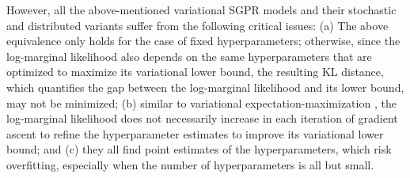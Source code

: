 \documentclass[conference]{IEEEtran}
\begin{document}
	However, all the above-mentioned variational SGPR models and their stochastic and distributed variants suffer from the following critical issues: 
	(a) The above equivalence only holds for the case of fixed hyperparameters;
	otherwise, since the log-marginal likelihood 
	also depends on the same hyperparameters that are optimized to maximize its variational lower bound, the resulting KL distance, which quantifies the gap between the log-marginal likelihood and its lower bound, may not be minimized;
	(b) similar to variational expectation-maximization \cite{Jordan08}, the log-marginal likelihood does not necessarily increase in each iteration of gradient ascent to refine the hyperparameter estimates to improve its variational lower bound; and
	(c) they all find point estimates of the hyperparameters, which risk overfitting, especially when the number of hyperparameters is all but small.
	
\end{document}
